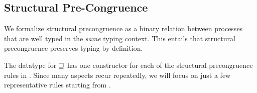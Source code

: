 \subsection{Structural Pre-Congruence}
\label{sec:congruence-agda}

We formalize structural precongruence as a binary relation between processes
that are well typed in the \emph{same} typing context. This entails that
structural precongruence preserves typing by definition.

\begin{AgdaAlign}
\begin{code}%
\>[0]\AgdaSpace{}%
\AgdaSpace{}%
\AgdaSymbol{:}\AgdaSpace{}%
\AgdaSymbol{\}}\AgdaSpace{}%
\AgdaSpace{}%
\AgdaSpace{}%
\AgdaSpace{}%
\AgdaSpace{}%
\AgdaSpace{}%
\AgdaSpace{}%
\AgdaSpace{}%
\AgdaSpace{}%
\<%
\end{code}

The datatype for $\sqsupseteq$ has one constructor for each of the structural
precongruence rules in . Since many aspects recur
repeatedly, we will focus on just a few representative rules starting from
\SComm.

\begin{code}%
\>[0][@{}l@{\AgdaIndent{1}}]%
\>[2]\AgdaSpace{}%
\AgdaSymbol{:}\<%
\\
\>[2][@{}l@{\AgdaIndent{0}}]%
\>[4]\AgdaSpace{}%
\AgdaSpace{}%
\AgdaSpace{}%
\AgdaSpace{}%
\AgdaSpace{}%
\AgdaSpace{}%
\AgdaSymbol{\}}\AgdaSpace{}%
\AgdaSymbol{(}\AgdaSpace{}%
\AgdaSymbol{:}\AgdaSpace{}%
\AgdaSpace{}%
\AgdaSpace{}%
\AgdaSymbol{)}\AgdaSpace{}%
\AgdaSymbol{(}\AgdaSpace{}%
\AgdaSymbol{:}\AgdaSpace{}%
\AgdaSpace{}%
\AgdaSpace{}%
\AgdaSpace{}%
\AgdaOperator{\AgdaDatatype{+}}\AgdaSpace{}%
\AgdaSymbol{)}\AgdaSpace{}%
\<%
\\
%
\>[4]\AgdaSpace{}%
\AgdaSpace{}%
\AgdaSpace{}%
\AgdaSpace{}%
\AgdaSpace{}%
\AgdaSpace{}%
\AgdaSpace{}%
\AgdaSymbol{(}\AgdaSpace{}%
\AgdaSymbol{)}\AgdaSpace{}%
\AgdaSymbol{(}\AgdaSpace{}%
\AgdaSymbol{)}\AgdaSpace{}%
\AgdaSpace{}%
\<%
\end{code}


\end{AgdaAlign}
